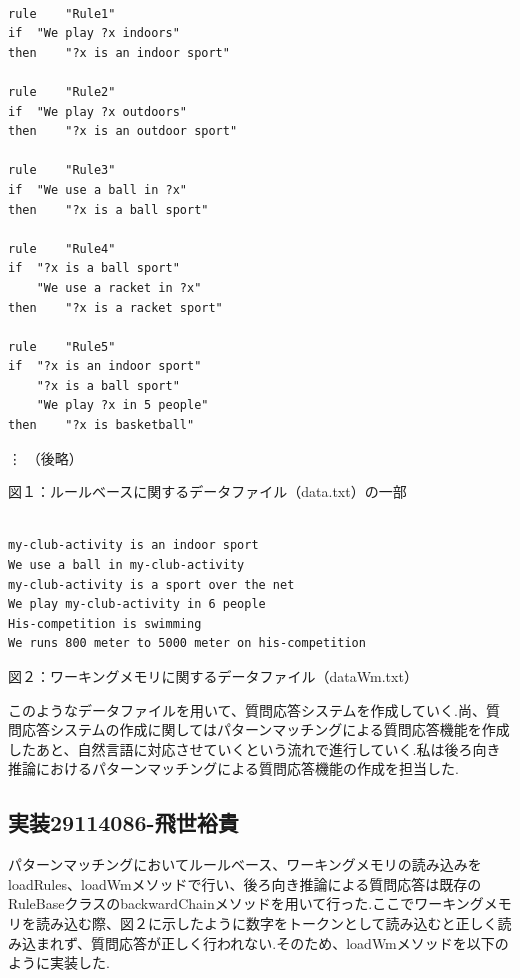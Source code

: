 \documentclass{jarticle}
\begin{document}
\begin{screen}
\begin{verbatim}

rule 	"Rule1"
if 	"We play ?x indoors"
then 	"?x is an indoor sport"

rule 	"Rule2"
if 	"We play ?x outdoors"
then 	"?x is an outdoor sport"

rule 	"Rule3"
if 	"We use a ball in ?x"
then 	"?x is a ball sport"

rule 	"Rule4"
if 	"?x is a ball sport"
	"We use a racket in ?x"
then 	"?x is a racket sport"

rule 	"Rule5"
if 	"?x is an indoor sport"
	"?x is a ball sport"
	"We play ?x in 5 people"
then 	"?x is basketball"
\end{verbatim}
\vdots
（後略）

\end{screen}
\begin{center}
図１：ルールベースに関するデータファイル（data.txt）の一部\\
\end{center}


\begin{screen}
\begin{verbatim}

my-club-activity is an indoor sport
We use a ball in my-club-activity
my-club-activity is a sport over the net
We play my-club-activity in 6 people
His-competition is swimming
We runs 800 meter to 5000 meter on his-competition

\end{verbatim}
\end{screen}
\begin{center}
図２：ワーキングメモリに関するデータファイル（dataWm.txt）\\
\end{center}
このようなデータファイルを用いて、質問応答システムを作成していく.尚、質問応答システムの作成に関してはパターンマッチングによる質問応答機能を作成したあと、自然言語に対応させていくという流れで進行していく.私は後ろ向き推論におけるパターンマッチングによる質問応答機能の作成を担当した.

\subsection{実装29114086-飛世裕貴}
パターンマッチングにおいてルールベース、ワーキングメモリの読み込みをloadRules、loadWmメソッドで行い、後ろ向き推論による質問応答は既存のRuleBaseクラスのbackwardChainメソッドを用いて行った.ここでワーキングメモリを読み込む際、図２に示したように数字をトークンとして読み込むと正しく読み込まれず、質問応答が正しく行われない.そのため、loadWmメソッドを以下のように実装した.\\
\end{document}
